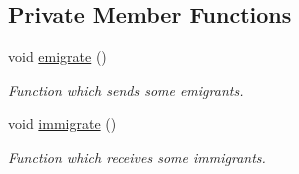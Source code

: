 \subsection*{Private Member Functions}
\begin{CompactItemize}
\item 
\hypertarget{classpeoAsyncIslandMig_2470f8ee04bc762c010c7ebb2392831d}{
void \hyperlink{classpeoAsyncIslandMig_2470f8ee04bc762c010c7ebb2392831d}{emigrate} ()}
\label{classpeoAsyncIslandMig_2470f8ee04bc762c010c7ebb2392831d}

\begin{CompactList}\small\item\em Function which sends some emigrants. \item\end{CompactList}\item 
\hypertarget{classpeoAsyncIslandMig_75a6592d63879773b39c9594b94fb942}{
void \hyperlink{classpeoAsyncIslandMig_75a6592d63879773b39c9594b94fb942}{immigrate} ()}
\label{classpeoAsyncIslandMig_75a6592d63879773b39c9594b94fb942}

\begin{CompactList}\small\item\em Function which receives some immigrants. \item\end{CompactList}\end{CompactItemize}
